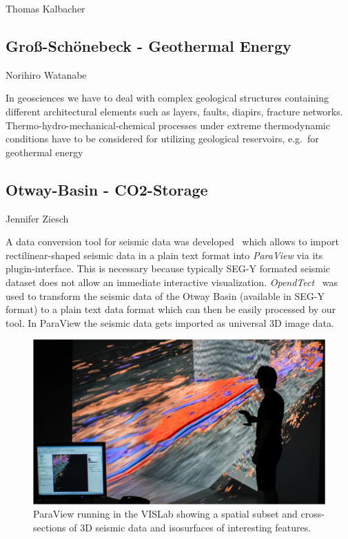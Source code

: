 \documentclass[twocolumn]{svjour3}          %
\begin{document}
Thomas Kalbacher \cite{zehner:modelcare, rink:iwas}




\subsection{Gro{\ss}-Sch\"onebeck - Geothermal Energy}
\label{grouss-schoenebeck---geothermal-energy}

Norihiro Watanabe

In geosciences we have to deal with complex geological structures containing different architectural elements such as layers, faults, diapirs, fracture networks. Thermo-hydro-mechanical-chemical processes under extreme thermodynamic conditions have to be considered for utilizing geological reservoirs, e.g.~for geothermal energy~\cite{zehner:uncertainty}

\subsection{Otway-Basin - CO2-Storage}
\label{otway-basin---co2-storage}

Jennifer Ziesch

A data conversion tool for seismic data was developed~\cite{bilke:simpleseismicreader} which allows to import rectilinear-shaped seismic data in a plain text format into \emph{ParaView} via its plugin-interface. This is necessary because typically SEG-Y formated seismic dataset does not allow an immediate interactive visualization. \emph{OpendTect}~\cite{web:opendtect} was used to transform the seismic data of the Otway Basin (available in SEG-Y format) to a plain text data format which can then be easily processed by our tool. In ParaView the seismic data gets imported as universal 3D image data.

\begin{figure}
  \includegraphics[width=\linewidth]{images/seismic.jpg}
\caption{ParaView running in the VISLab showing a spatial subset and cross-sections of 3D seismic data and isosurfaces of interesting features.}
\label{fig:seismic}
\end{figure}
\end{document}
